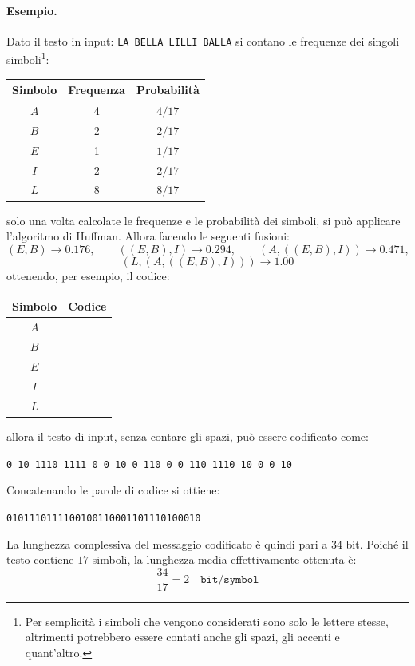 \documentclass{article}
\theoremstyle{definition}
\newcommand{\lbox}[1]{\makebox[1em][l]{#1}} %
\numberwithin{equation}{section}
\begin{document}
\paragraph{Esempio.}
Dato il testo in input: \texttt{LA BELLA LILLI BALLA} si contano le frequenze dei singoli simboli\footnote{Per semplicità i simboli che vengono considerati sono solo le lettere stesse, altrimenti potrebbero essere contati anche gli spazi, gli accenti e quant'altro.}:
\begin{center}
    \begin{tabular}{|c|c|c|}
        \hline
        \textbf{Simbolo} & \textbf{Frequenza} & \textbf{Probabilità} \\ \hline
        $A$              & 4                  & $4/17$               \\ \hline
        $B$              & 2                  & $2/17$               \\ \hline
        $E$              & 1                  & $1/17$               \\ \hline
        $I$              & 2                  & $2/17$               \\ \hline
        $L$              & 8                  & $8/17$               \\ \hline
    \end{tabular}
\end{center}
solo una volta calcolate le frequenze e le probabilità dei simboli, si può applicare l'algoritmo di Huffman. Allora facendo le seguenti fusioni:
\[
    (E,B) \rightarrow 0.176,
    \qquad
    ((E,B),I) \rightarrow 0.294,
    \qquad
    (A,((E,B),I)) \rightarrow 0.471,
\]
\[
    (L,(A,((E,B),I))) \rightarrow 1.00
\]
ottenendo, per esempio, il codice:
\begin{center}
    \begin{tabular}{|c|c|}
        \hline
        \textbf{Simbolo} & \textbf{Codice} \\ \hline
        $A$              & \lbox{10}       \\ \hline
        $B$              & \lbox{1110}     \\ \hline
        $E$              & \lbox{1111}     \\ \hline
        $I$              & \lbox{110}      \\ \hline
        $L$              & \lbox{0}        \\ \hline
    \end{tabular}
\end{center}
allora il testo di input, senza contare gli spazi, può essere codificato come:
\begin{center}
    \texttt{0 10 1110 1111 0 0 10 0 110 0 0 110 1110 10 0 0 10}
\end{center}
Concatenando le parole di codice si ottiene:
\begin{center}
    \texttt{0101110111100100110001101110100010}
\end{center}
La lunghezza complessiva del messaggio codificato è quindi pari a $34$ bit. Poiché il testo contiene $17$ simboli, la lunghezza media effettivamente ottenuta è:
\[
    \frac{34}{17}=2\quad \texttt{bit/symbol}
\]
\end{document}
